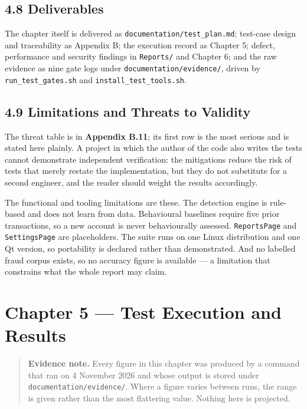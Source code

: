 \documentclass[
  12pt,
]{report}
\begin{document}
\section{4.8 Deliverables}\label{deliverables}

The chapter itself is delivered as \texttt{documentation/\allowbreak{}test\_plan.md};
test-case design and traceability as Appendix B; the execution record as
Chapter 5; defect, performance and security findings in
\texttt{Reports/\allowbreak{}} and Chapter 6; and the raw evidence as nine gate logs
under \texttt{documentation/\allowbreak{}evidence/\allowbreak{}}, driven by
\texttt{run\_test\_gates.sh} and \texttt{install\_test\_tools.sh}.

\section{4.9 Limitations and Threats to
Validity}\label{limitations-and-threats-to-validity}

The threat table is in \textbf{Appendix B.11}; its first row is the most
serious and is stated here plainly. A project in which the author of the
code also writes the tests cannot demonstrate independent verification:
the mitigations reduce the risk of tests that merely restate the
implementation, but they do not substitute for a second engineer, and
the reader should weight the results accordingly.

The functional and tooling limitations are these. The detection engine
is rule-based and does not learn from data. Behavioural baselines
require five prior transactions, so a new account is never behaviourally
assessed. \texttt{ReportsPage} and \texttt{SettingsPage} are
placeholders. The suite runs on one Linux distribution and one Qt
version, so portability is declared rather than demonstrated. And no
labelled fraud corpus exists, so no accuracy figure is available --- a
limitation that constrains what the whole report may claim.

\chapter{Chapter 5 --- Test Execution and
Results}\label{chapter-5-test-execution-and-results}

\begin{quote}
\textbf{Evidence note.} Every figure in this chapter was produced by a
command that ran on 4 November 2026 and whose output is stored under
\texttt{documentation/\allowbreak{}evidence/\allowbreak{}}. Where a figure varies between runs,
the range is given rather than the most flattering value. Nothing here
is projected.
\end{quote}
\end{document}
